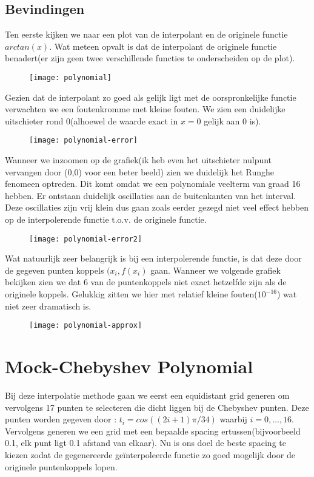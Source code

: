 \documentclass[10pt,a4paper,twocolumn]{article}
\begin{document}
\subsection{Bevindingen}
Ten eerste kijken we naar een plot van de interpolant en de originele functie $arctan(x)$. Wat meteen opvalt is dat de interpolant de originele functie benadert(er zijn geen twee verschillende functies te onderscheiden op de plot).
\begin{figure}[h]
\texttt{[image: polynomial]}
\end{figure}
\newline
Gezien dat de interpolant zo goed als gelijk ligt met de oorspronkelijke functie verwachten we een foutenkromme met kleine fouten. We zien een duidelijke uitschieter rond 0(alhoewel de waarde exact in $x = 0$ gelijk aan 0 is).
\begin{figure}[h]
\texttt{[image: polynomial-error]}
\end{figure}
\newline
Wanneer we inzoomen op de grafiek(ik heb even het uitschieter nulpunt vervangen door (0,0) voor een beter beeld) zien we duidelijk het Runghe fenomeen optreden. Dit komt omdat we een polynomiale veelterm van graad 16 hebben. Er ontstaan duidelijk oscillaties aan de buitenkanten van het interval. Deze oscillaties zijn vrij klein dus gaan zoals eerder gezegd niet veel effect hebben op de interpolerende functie t.o.v. de originele functie.
\begin{figure}[h]
\texttt{[image: polynomial-error2]}
\end{figure}
\newline
Wat natuurlijk zeer belangrijk is bij een interpolerende functie, is dat deze door de gegeven punten koppels $(x_{i}, f(x_{i})$  gaan. Wanneer we volgende grafiek bekijken zien we dat 6 van de puntenkoppels niet exact hetzelfde zijn als de originele koppels. Gelukkig zitten we hier met relatief kleine fouten($10^{-16}$) wat niet zeer dramatisch is.
\begin{figure}[h]
\texttt{[image: polynomial-approx]}
\end{figure}
\newline
\section{Mock-Chebyshev Polynomial}
Bij deze interpolatie methode gaan we eerst een equidistant grid generen om vervolgens 17 punten te selecteren die dicht liggen bij de Chebyshev punten. Deze punten worden gegeven door : $t_{i} = cos((2i + 1)\pi/34)$ waarbij $i = 0,\hdots,16$. Vervolgens generen we een grid met een bepaalde spacing ertussen(bijvoorbeeld 0.1, elk punt ligt 0.1 afstand van elkaar). Nu is ons doel de beste spacing te kiezen zodat de gegenereerde geïnterpoleerde functie zo goed mogelijk door de originele puntenkoppels lopen.
\end{document}
